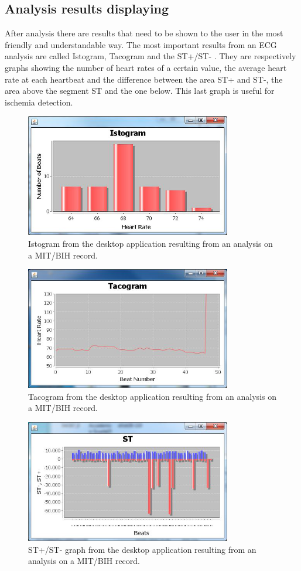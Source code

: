 \subsection{Analysis results displaying}
After analysis there are results that need to be shown to the user in the most friendly and understandable way. The most important results from an ECG analysis are called Istogram, Tacogram and the ST+/ST- . They are respectively graphs showing the number of heart rates of a certain value, the average heart rate at each heartbeat and the difference between the area ST+ and ST-, the area above the segment ST and the one below. This last graph is useful for ischemia detection.\cite{ref4}
\begin{figure}[ht!]
	\centering
	\includegraphics[width=90mm]{figures/ch5/1.png}
	\caption{ Istogram from the desktop application resulting from an analysis on a MIT/BIH record.}
	\label{fig5.1}
\end{figure}
\begin{figure}[ht!]
	\centering
	\includegraphics[width=90mm]{figures/ch5/2.png}
	\caption{Tacogram from the desktop application resulting from an analysis on a MIT/BIH record.}
	\label{fig5.2}
\end{figure}
\begin{figure}[ht!]
	\centering
	\includegraphics[width=90mm]{figures/ch5/3.png}
	\caption{ST+/ST- graph from the desktop application resulting from an analysis on a MIT/BIH record.}
	\label{fig5.3}
\end{figure}

